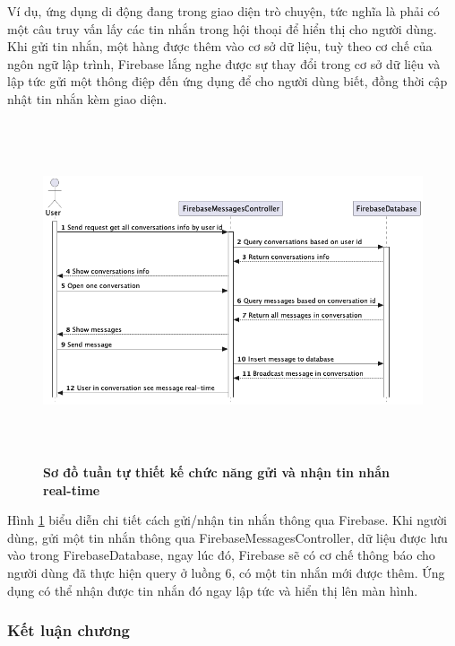 Ví dụ, ứng dụng di động đang trong giao diện trò chuyện, tức nghĩa là phải có một câu truy vấn lấy các tin nhắn trong hội thoại
để hiển thị cho người dùng. Khi gửi tin nhắn, một hàng được thêm vào
cơ sở dữ liệu, tuỳ theo cơ chế của ngôn ngữ lập trình, Firebase lắng nghe được sự thay đổi
trong cơ sở dữ liệu và lập tức gửi một thông điệp đến ứng dụng để cho người dùng biết, đồng thời cập nhật tin nhắn kèm giao diện.

\begin{figure}[H]
  \centering
  \includegraphics[width=16cm,height=10cm]{Images/mobile_app/design_send_receive_message.png}
  \caption[Sơ đồ tuần tự thiết kế chức năng gửi và nhận tin nhắn real-time]{\bfseries \fontsize{12pt}{0pt}
  \selectfont Sơ đồ tuần tự thiết kế chức năng gửi và nhận tin nhắn real-time}
  \label{design_send_receive_firebase_message} %
\end{figure}

Hình \ref{design_send_receive_firebase_message} biểu diễn chi tiết cách gửi/nhận tin nhắn thông qua Firebase. Khi người dùng,
gửi một tin nhắn thông qua FirebaseMessagesController, dữ liệu được lưu vào trong FirebaseDatabase, ngay lúc đó, Firebase sẽ có
cơ chế thông báo cho người dùng đã thực hiện query ở luồng 6, có một tin nhắn mới được thêm. Ứng dụng có thể nhận được tin nhắn
đó ngay lập tức và hiển thị lên màn hình.

\subsubsection{Kết luận chương}

\newpage